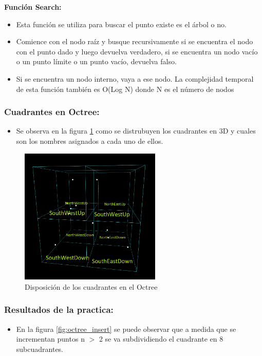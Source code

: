 \documentclass{article}
\begin{document}
\textbf{Función Search:}
\begin{itemize}
\item Esta función se utiliza para buscar el punto existe es el árbol o no.
\item Comience con el nodo raíz y busque recursivamente si se encuentra el nodo con el punto dado y luego devuelva verdadero, si se encuentra un nodo vacío o un punto límite o un punto vacío, devuelva falso.
\item Si se encuentra un nodo interno, vaya a ese nodo. La complejidad temporal de esta función también es O(Log N) donde N es el número de nodos
\end{itemize}

\subsubsection{Cuadrantes en Octree: }
\begin{itemize}
    \item Se observa en la figura \ref{fig:octree_cuadrante} como se distrubuyen los cuadrantes en 3D y cuales son los nombres asignados a cada uno de ellos.
\end{itemize}
\begin{figure}[htbp]
\centering
\includegraphics[width=0.6\textwidth]{img/octree_cuadrante.png}
\caption{Disposición de los cuadrantes en el Octree}
\label{fig:octree_cuadrante}
\end{figure}

\subsubsection{Resultados de la practica: }

\begin{itemize}
\item En la figura \ref{fig:octree_insert} se puede observar que a medida que se incrementan puntos n $>$ 2 se va subdividiendo el cuadrante en 8 subcuadrantes.
\end{itemize}
\end{document}
